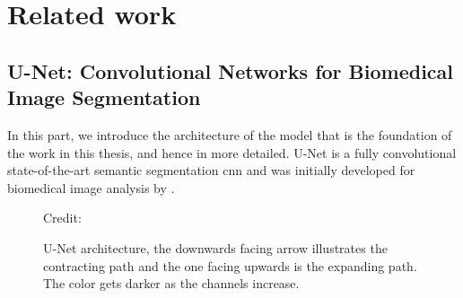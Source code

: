 \chapter{Related work}

\section{U-Net: Convolutional Networks for Biomedical
Image Segmentation} \label{unet}

    In this part, we introduce the architecture of the model that is the foundation of the work in this thesis, and hence in  more detailed. U-Net is a fully convolutional state-of-the-art\cite{rajak2021segmentation} semantic segmentation \gls{cnn} and was initially developed for biomedical image analysis by \citeauthor{unet_ronneberger2015}\cite{unet_ronneberger2015}. 
    
    \begin{figure}[H]
        \centering
        
        \caption[U-Net architecture]{U-Net architecture, the downwards facing arrow illustrates the contracting path and the one facing upwards is the expanding path. The color gets darker as the channels increase.}
      	\medskip 
        \label{unet_fig}
        \hspace*{15pt}\hbox{\scriptsize Credit: \citeauthor{unet_ronneberger2015}\cite{unet_ronneberger2015}}
    \end{figure}
    
